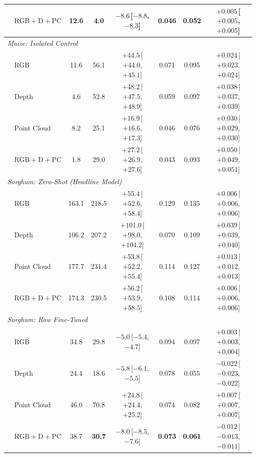 \documentclass[10pt,twocolumn,letterpaper]{article}
\begin{document}
\begin{table}[t]
\begin{tabular}{l l ccc ccc}
    & $\mathrm{RGB}+\mathrm{D}+\mathrm{PC}$ & 12.6 & \textbf{4.0} & $-8.6$\,{\scriptsize[$-8.8$, $-8.3$]} & \textbf{0.046} & \textbf{0.052} & $+0.005$\,{\scriptsize[$+0.005$, $+0.005$]} \\
    \midrule
    \multicolumn{8}{l}{\emph{Maize: Isolated Control}} \\
    & RGB & 11.6 & 56.1 & $+44.5$\,{\scriptsize[$+44.0$, $+45.1$]} & 0.071 & 0.095 & $+0.024$\,{\scriptsize[$+0.023$, $+0.024$]} \\
    & Depth & 4.6 & 52.8 & $+48.2$\,{\scriptsize[$+47.5$, $+48.9$]} & 0.059 & 0.097 & $+0.038$\,{\scriptsize[$+0.037$, $+0.039$]} \\
    & Point Cloud & 8.2 & 25.1 & $+16.9$\,{\scriptsize[$+16.6$, $+17.3$]} & 0.046 & 0.076 & $+0.030$\,{\scriptsize[$+0.029$, $+0.030$]} \\
    & $\mathrm{RGB}+\mathrm{D}+\mathrm{PC}$ & 1.8 & 29.0 & $+27.2$\,{\scriptsize[$+26.9$, $+27.6$]} & 0.043 & 0.093 & $+0.050$\,{\scriptsize[$+0.049$, $+0.051$]} \\
    \midrule
    \multicolumn{8}{l}{\emph{Sorghum: Zero-Shot (Headline Model)}} \\
    & RGB & 163.1 & 218.5 & $+55.4$\,{\scriptsize[$+52.6$, $+58.4$]} & 0.129 & 0.135 & $+0.006$\,{\scriptsize[$+0.006$, $+0.006$]} \\
    & Depth & 106.2 & 207.2 & $+101.0$\,{\scriptsize[$+98.0$, $+104.2$]} & 0.070 & 0.109 & $+0.039$\,{\scriptsize[$+0.039$, $+0.040$]} \\
    & Point Cloud & 177.7 & 231.4 & $+53.8$\,{\scriptsize[$+52.2$, $+55.4$]} & 0.114 & 0.127 & $+0.013$\,{\scriptsize[$+0.012$, $+0.013$]} \\
    & $\mathrm{RGB}+\mathrm{D}+\mathrm{PC}$ & 174.3 & 230.5 & $+56.2$\,{\scriptsize[$+53.9$, $+58.5$]} & 0.108 & 0.114 & $+0.006$\,{\scriptsize[$+0.006$, $+0.006$]} \\
    \midrule
    \multicolumn{8}{l}{\emph{Sorghum: Row Fine-Tuned}} \\
    & RGB & 34.8 & 29.8 & $-5.0$\,{\scriptsize[$-5.4$, $-4.7$]} & 0.094 & 0.097 & $+0.003$\,{\scriptsize[$+0.003$, $+0.004$]} \\
    & Depth & 24.4 & 18.6 & $-5.8$\,{\scriptsize[$-6.1$, $-5.5$]} & 0.078 & 0.055 & $-0.022$\,{\scriptsize[$-0.023$, $-0.022$]} \\
    & Point Cloud & 46.0 & 70.8 & $+24.8$\,{\scriptsize[$+24.4$, $+25.2$]} & 0.074 & 0.082 & $+0.007$\,{\scriptsize[$+0.007$, $+0.007$]} \\
    & $\mathrm{RGB}+\mathrm{D}+\mathrm{PC}$ & 38.7 & \textbf{30.7} & $-8.0$\,{\scriptsize[$-8.5$, $-7.6$]} & \textbf{0.073} & \textbf{0.061} & $-0.012$\,{\scriptsize[$-0.013$, $-0.011$]} \\

\end{tabular}
\end{table}
\end{document}

